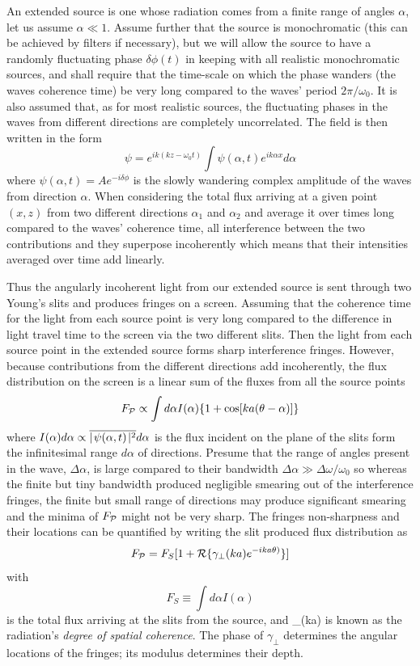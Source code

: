 An extended source is one whose radiation comes from a finite range of angles $\alpha$, let us assume $\alpha\ll 1$. Assume further that the source is monochromatic (this can be achieved by filters if necessary), but we will allow the source to have a 
randomly fluctuating phase $\delta\phi(t)$ in keeping with all realistic monochromatic sources, and shall require that the time-scale on which the phase wanders (the waves coherence time) be very long compared to the waves' period $2\pi/\omega_0$. It is also assumed that, as for most realistic sources, the fluctuating phases in the waves from different directions are completely uncorrelated. The field is then written in the 
form
\[
\psi=e^{ik(kz-\omega_0t)}\int\psi(\alpha,t)e^{ik\alpha x}d\alpha
\]
where $\psi(\alpha,t)=Ae^{-i\delta\phi}$ is the slowly wandering complex amplitude of the waves from direction $\alpha$. When considering the total flux arriving at a given point $(x,z)$ from two different directions $\alpha_1$ and $\alpha_2$ and average it over times long compared to the waves' coherence time, all interference between the two contributions and they superpose incoherently which means that their intensities averaged over time add linearly.

Thus the angularly incoherent light from our extended source is sent through two Young's slits and produces fringes on a screen. Assuming that the coherence time for the
light from each source point is very long compared to the difference in light travel time
 to the screen via the two different slits. Then the light from each source point in the 
extended source forms sharp interference fringes. However, because contributions from the different directions add incoherently, the flux distribution on the screen is a linear sum of the fluxes from all the source points
\[
F_{{\cal P}}\propto\int d\alpha I(\alpha)\{1+\cos[ka(\theta-\alpha)]\}
\]
where $I(\alpha)d\alpha\propto\overline{\mid\!\psi(\alpha,t)\!\mid^2}d\alpha$ is the flux incident on the plane of the slits form the infinitesimal range $d\alpha$ of directions. Presume that the range of angles present in the wave, $\Delta\alpha$, is large compared to their bandwidth $\Delta\alpha\gg{\Delta\omega/\omega_0}$ so whereas the finite but tiny bandwidth produced negligible smearing out of the interference fringes, the finite but small range of directions may produce significant smearing and the minima of $F_{{\cal P}}$ might not be very sharp. The fringes non-sharpness and their locations can be quantified by writing the slit produced flux distribution as
\[
F_{{\cal P}}=F_S[1+{\cal R}\{\gamma_\perp(ka)e^{-ika\theta)}\}]
\]
with
\[
F_S\equiv\int d\alpha I(\alpha)
\]
is the total flux arriving at the slits from the source, and 
\be
\gamma_\perp(ka)
\label{eq:spatial-coherence}
\ee
is known as the radiation's {\it degree of spatial coherence}. The phase of $\gamma_\perp$ determines the angular locations of the fringes; its modulus determines their depth. 

